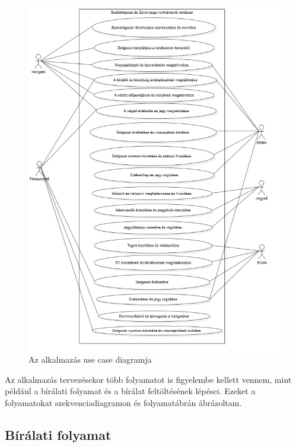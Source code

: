 \begin{figure}[h]
\centering
\includegraphics[scale=0.5]{images/Use_case_diagram.png}
\caption{Az alkalmazás use case diagramja}
\label{fig:usecase}
\end{figure}


Az alkalmazás tervezésekor több folyamatot is figyelembe kellett vennem, mint például a bírálati folyamat és a bírálat feltöltésének lépései. Ezeket a folyamatokat szekvenciadiagramon és folyamatábrán ábrázoltam.

\subsection{Bírálati folyamat}

\vspace{0.5cm}

